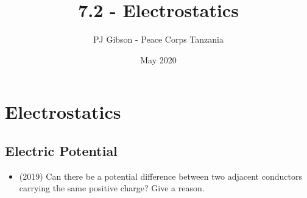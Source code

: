 \documentclass{article}
\title{7.2 - Electrostatics}
\author{PJ Gibson - Peace Corps Tanzania}
\date{May 2020}
\begin{document}
\maketitle


\section{Electrostatics}

\subsection{Electric Potential}
\begin{itemize}
\item (2019)  Can there be a potential difference between two adjacent conductors carrying the same positive charge? Give a reason. 
\end{itemize}
\end{document}
